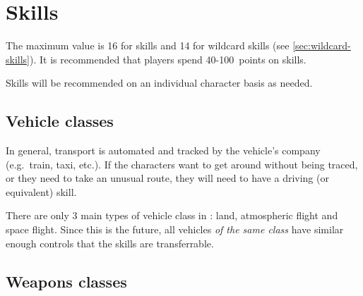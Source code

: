 \begin{traitlist}
   

\end{traitlist}

\section{Skills}
\label{sec:skills}

The maximum value is 16 for skills and 14 for wildcard skills (see
\autoref{sec:wildcard-skills}). It is recommended that players spend
40-100~points on skills.

Skills will be recommended on an individual character basis as needed.

\subsection{Vehicle classes}
\label{sec:vehicle-classes}

In general, transport is automated and tracked by the vehicle's company
(e.g.~train, taxi, etc.). If the characters want to get around without
being traced, or they need to take an unusual route, they will need to have a
driving (or equivalent) skill.

There are only 3 main types of vehicle class in : land, atmospheric
flight and space flight. Since this is the future, all vehicles \emph{of the
  same class} have similar enough controls that the skills are transferrable.

\subsection{Weapons classes}
\label{sec:weapons-classes}

